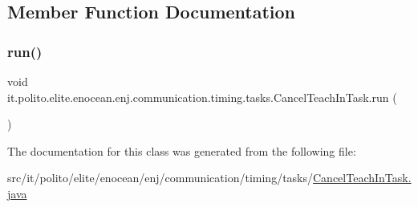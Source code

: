 \subsection{Member Function Documentation}
\hypertarget{classit_1_1polito_1_1elite_1_1enocean_1_1enj_1_1communication_1_1timing_1_1tasks_1_1_cancel_teach_in_task_a9391c37b46ed0750fcffbfb3b507657e}{}\label{classit_1_1polito_1_1elite_1_1enocean_1_1enj_1_1communication_1_1timing_1_1tasks_1_1_cancel_teach_in_task_a9391c37b46ed0750fcffbfb3b507657e} 
\subsubsection{\texorpdfstring{run()}{run()}}
{\footnotesize\ttfamily void it.\+polito.\+elite.\+enocean.\+enj.\+communication.\+timing.\+tasks.\+Cancel\+Teach\+In\+Task.\+run (\begin{DoxyParamCaption}{ }\end{DoxyParamCaption})}



The documentation for this class was generated from the following file\+:\begin{DoxyCompactItemize}
\item 
src/it/polito/elite/enocean/enj/communication/timing/tasks/\hyperlink{_cancel_teach_in_task_8java}{Cancel\+Teach\+In\+Task.\+java}\end{DoxyCompactItemize}
